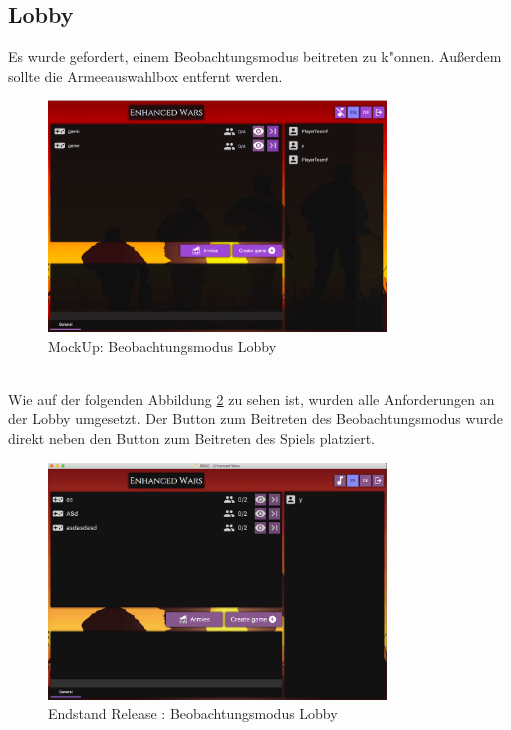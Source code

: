 \documentclass[12pt, titlepage]{scrartcl}
\newcommand{\RN}[1]{%
	\textup{\uppercase\expandafter{\romannumeral#1}}%
}
\begin{document}
		\subsection{Lobby}
			Es wurde gefordert, einem Beobachtungsmodus beitreten zu k"onnen. Au{\ss}erdem sollte die Armeeauswahlbox entfernt werden.
			\begin{figure}[H] 
				\centering
				\includegraphics[width=0.8\textwidth]{images/mockUps/LobbyWatchMode.png}
				\caption{MockUp: Beobachtungsmodus Lobby}
				\label{Watch_Mode_2}
			\end{figure}
	\newpage
			\ \\ Wie auf der folgenden Abbildung \ref{End_Watch_Mode} zu sehen ist, wurden alle Anforderungen an der Lobby umgesetzt. Der Button zum Beitreten des Beobachtungsmodus wurde direkt neben den Button zum Beitreten des Spiels platziert.
			\begin{figure}[H] 
				\centering
				\includegraphics[width=0.8\textwidth]{images/endOfRelease/LobbyWatchMode.png}
				\caption{Endstand Release \RN{3}: Beobachtungsmodus Lobby}
				\label{End_Watch_Mode}
			\end{figure}
\end{document}
